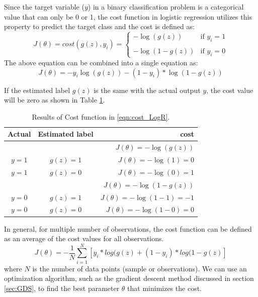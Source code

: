 Since the target variable ($y$) in a binary classification problem is a categorical value that can only be 0 or 1, the cost function in logistic regression utilizes this property to predict the target class and the cost is defined as:
\begin{equation}\label{eqn:cost_LogR}
  J(\theta) = cost(g(z), y_i) = \begin{cases}
                    -\log (g(z)) &     \text{if $y_i = 1$}\\
                                 & \\
                    -\log (1-g(z)) &  \text{if $y_i = 0$}
                    \end{cases}
\end{equation} The above equation can be combined into a single equation as:
\begin{equation}\label{eqn:cost_LogR2}
  J(\theta) = -y_i \log (g(z)) - (1-y_i) * \log (1-g(z))
\end{equation}


If the estimated label $g(z)$ is the same with the actual output $y$, the cost value will be zero as shown in Table \ref{tb:LRcostR}.
\begin{table}[!ht]
\centering
\begin{tabular}{|c|c|r|}
  \hline
  Actual  & Estimated label & cost \\
  \hline
  & & $J(\theta) = -\log (g(z))$\\
  \hline
  $y =1$ & $g(z)=1$ & $J(\theta) = -\log (1)=0$\\
  $y =1$ & $g(z)=0$ & $J(\theta) = -\log (0)=1$\\
  \hline
  & & $J(\theta) = -\log (1-g(z))$\\
  \hline
  $y =0$ & $g(z)=1$ & $J(\theta) = -\log (1-1)=-1$\\
  $y =0$ & $g(z)=0$ & $J(\theta) = -\log (1-0)=0$\\
  \hline
\end{tabular}
\caption{Results of Cost function in \ref{eqn:cost_LogR}.}\label{tb:LRcostR}
\end{table}


In general, for multiple number of observations, the cost function can be defined as an average of the cost values for all observations.
\begin{equation}\label{eqn:cost_LogR_F}
  J(\theta) = -\frac{1}{N} \sum_{i=1}^N \left[y_i*log (g(z) + (1-y_i)*log(1-g(z)\right]
\end{equation} where $N$ is the number of data points (sample or observations). We can use an optimization algorithm, such as the gradient descent method discussed in section \ref{sec:GDS}, to find the best parameter $\theta$ that minimizes the cost.


